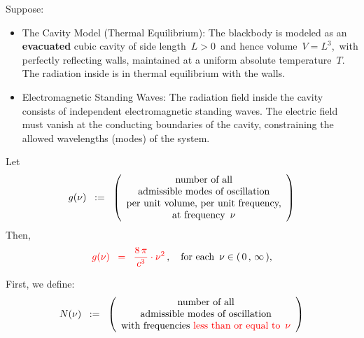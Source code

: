 \vskip 0.5cm
\begin{proposition} %
\mbox{}
\vskip 0.2cm
\noindent
Suppose:
\begin{itemize}
\item
    The Cavity Model (Thermal Equilibrium):
    The blackbody is modeled as an \textbf{\color{red}evacuated} cubic cavity
    of side length \,$L > 0$\, and hence volume \,$V = L^3$,\,
    with perfectly reflecting walls, maintained
    at a uniform absolute temperature \,$T$.\,
    The radiation inside is in thermal equilibrium with the walls.
\item
    Electromagnetic Standing Waves: The radiation field inside the cavity
    consists of independent electromagnetic standing waves.
    The electric field must vanish at the conducting boundaries of the cavity,
    constraining the allowed wavelengths (modes) of the system.
\end{itemize}
Let
\begin{equation*}
g(\nu)
\;\; := \;\;
    \left(\begin{array}{c}
        \textnormal{number of all}
        \\
        \textnormal{admissible modes of oscillation}
        \\
        \textnormal{per unit volume, per unit frequency,}
        \\
        \textnormal{at frequency \,$\nu$}
        \end{array}\right)
\end{equation*}
Then,
\begin{equation*}
{\color{red}
g(\nu)
\;\; = \;\;
    \dfrac{
        8\,\pi
        }{
        c^{3}
        }
    \cdot
    \nu^{2}
}\,,
\quad
\textnormal{for each \,$\nu \in (\,0\,,\,\infty\,)$},
\end{equation*}
\end{proposition}
\proof

\vskip 0.3cm
\noindent
First, we define:
\begin{equation*}
N(\nu)
\;\; := \;\;
    \left(\begin{array}{c}
        \textnormal{number of all}
        \\
        \textnormal{admissible modes of oscillation}
        \\
        \textnormal{with frequencies {\color{red}less than or equal to \,$\nu$}}
        \end{array}\right)
\end{equation*}

